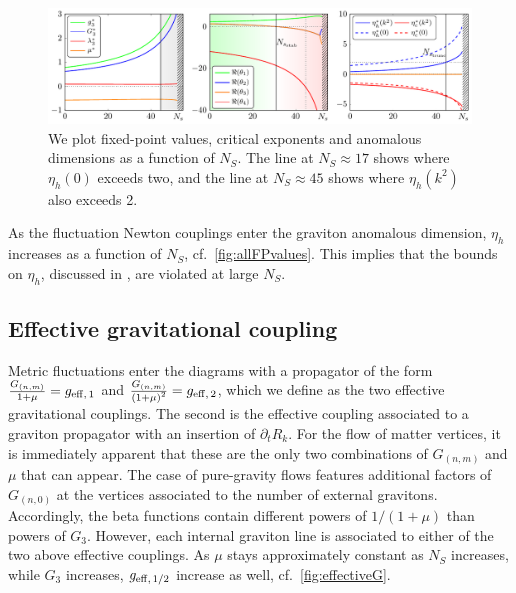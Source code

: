 \documentclass[11pt]{book} %
\begin{document}
%
\begin{widetext}
\begin{figure}[t!]
\includegraphics[width=\textwidth]{NS_findiff_all_hss_b.pdf}
\caption{We plot fixed-point values, critical exponents and anomalous dimensions as a function of $N_S$.
	The line at $N_S \approx 17$ shows where $\eta_h(0)$ exceeds two, and the line at $N_S \approx 45$ shows where $\eta_h(k^2)$ also exceeds 2.}
\label{fig:allFPvalues}
\end{figure}
\end{widetext}
%

As the fluctuation Newton couplings enter the graviton anomalous dimension, $\eta_h$ increases as a function of $N_S$, cf.~\autoref{fig:allFPvalues}.
This implies that the bounds on $\eta_h$, discussed in \cite{Meibohm:2015twa}, are violated at large $N_S$.

%
\subsection{Effective gravitational coupling}
%
Metric fluctuations enter the diagrams with a propagator of the form $\frac{G_{(n,m)}}{1+\mu} = g_{\rm eff,\,1}$ and $\frac{G_{(n,m)}}{\left(1+\mu\right)^2}= g_{\rm eff, \, 2}$,
which we define as the two effective gravitational couplings. 
The second is the effective coupling associated to a graviton propagator with an insertion of $\partial_t R_k$.
For the flow of matter vertices, it is immediately apparent that these are the only two combinations of $G_{(n,m)}$ and $\mu$ that can appear.
The case of pure-gravity flows features additional factors of $G_{(n,0)}$ at the vertices associated to the number of external gravitons.
Accordingly, the beta functions contain different powers of $1/(1+\mu)$ than powers of $G_3$. 
However, each internal graviton line is associated to either of the two above effective couplings.
As $\mu$ stays approximately constant as $N_S$ increases, while $G_3$ increases, $g_{\rm eff,\,1/2}$ increase as well, cf.~\autoref{fig:effectiveG}.
\end{document}
